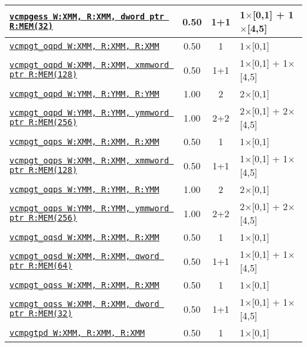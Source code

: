 \documentclass[a4paper,english,fontsize=9]{scrartcl}
\begin{document}
\begin{longtable}{p{}ccL{.25\textwidth}}
  \midrule
  \texttt{\href{https://felixcloutier.com/x86/CMPSS.html}{vcmpgess W:XMM, R:XMM, dword ptr R:MEM(32)}} & 0.50 & 1+1 & 1\(\times\)[0,1] + 1\(\times\)[4,5] \\
  \midrule
  \texttt{\href{https://felixcloutier.com/x86/CMPPD.html}{vcmpgt\_oqpd W:XMM, R:XMM, R:XMM}} & 0.50 & 1 & 1\(\times\)[0,1] \\
  \midrule
  \texttt{\href{https://felixcloutier.com/x86/CMPPD.html}{vcmpgt\_oqpd W:XMM, R:XMM, xmmword ptr R:MEM(128)}} & 0.50 & 1+1 & 1\(\times\)[0,1] + 1\(\times\)[4,5] \\
  \midrule
  \texttt{\href{https://felixcloutier.com/x86/CMPPD.html}{vcmpgt\_oqpd W:YMM, R:YMM, R:YMM}} & 1.00 & 2 & 2\(\times\)[0,1] \\
  \midrule
  \texttt{\href{https://felixcloutier.com/x86/CMPPD.html}{vcmpgt\_oqpd W:YMM, R:YMM, ymmword ptr R:MEM(256)}} & 1.00 & 2+2 & 2\(\times\)[0,1] + 2\(\times\)[4,5] \\
  \midrule
  \texttt{\href{https://felixcloutier.com/x86/CMPPS.html}{vcmpgt\_oqps W:XMM, R:XMM, R:XMM}} & 0.50 & 1 & 1\(\times\)[0,1] \\
  \midrule
  \texttt{\href{https://felixcloutier.com/x86/CMPPS.html}{vcmpgt\_oqps W:XMM, R:XMM, xmmword ptr R:MEM(128)}} & 0.50 & 1+1 & 1\(\times\)[0,1] + 1\(\times\)[4,5] \\
  \midrule
  \texttt{\href{https://felixcloutier.com/x86/CMPPS.html}{vcmpgt\_oqps W:YMM, R:YMM, R:YMM}} & 1.00 & 2 & 2\(\times\)[0,1] \\
  \midrule
  \texttt{\href{https://felixcloutier.com/x86/CMPPS.html}{vcmpgt\_oqps W:YMM, R:YMM, ymmword ptr R:MEM(256)}} & 1.00 & 2+2 & 2\(\times\)[0,1] + 2\(\times\)[4,5] \\
  \midrule
  \texttt{\href{https://felixcloutier.com/x86/CMPSD.html}{vcmpgt\_oqsd W:XMM, R:XMM, R:XMM}} & 0.50 & 1 & 1\(\times\)[0,1] \\
  \midrule
  \texttt{\href{https://felixcloutier.com/x86/CMPSD.html}{vcmpgt\_oqsd W:XMM, R:XMM, qword ptr R:MEM(64)}} & 0.50 & 1+1 & 1\(\times\)[0,1] + 1\(\times\)[4,5] \\
  \midrule
  \texttt{\href{https://felixcloutier.com/x86/CMPSS.html}{vcmpgt\_oqss W:XMM, R:XMM, R:XMM}} & 0.50 & 1 & 1\(\times\)[0,1] \\
  \midrule
  \texttt{\href{https://felixcloutier.com/x86/CMPSS.html}{vcmpgt\_oqss W:XMM, R:XMM, dword ptr R:MEM(32)}} & 0.50 & 1+1 & 1\(\times\)[0,1] + 1\(\times\)[4,5] \\
  \midrule
  \texttt{\href{https://felixcloutier.com/x86/CMPPD.html}{vcmpgtpd W:XMM, R:XMM, R:XMM}} & 0.50 & 1 & 1\(\times\)[0,1] \\

\end{longtable}
\end{document}
